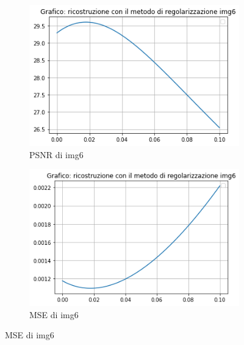 \begin{figure}[H]
    \begin{subfigure}{0.5\textwidth}
        \centering
        \includegraphics[width=\textwidth]{output/PSNR/outputPSNR-img6.png}
        \caption{PSNR di img6}
        \label{fig:img6PSNR}
    \end{subfigure}\hfill
    \begin{subfigure}{0.5\textwidth}
        \centering
        \includegraphics[width=\textwidth]{output/MSE/outputMSE-img6.png}
        \caption{MSE di img6}
        \label{fig:img6MSE}
    \end{subfigure}


\end{figure}
